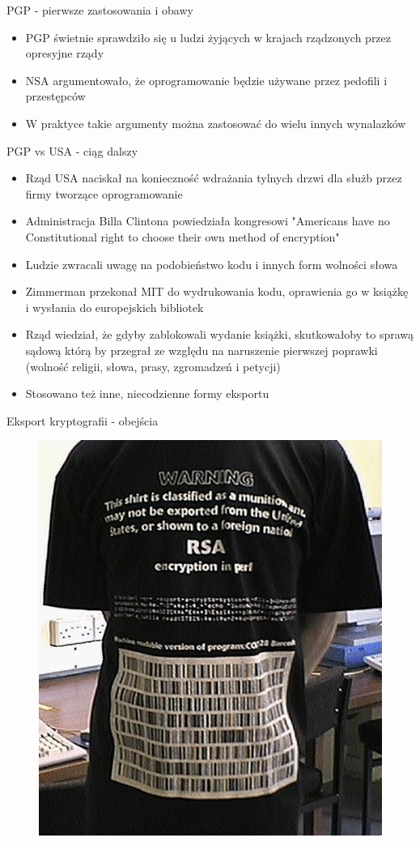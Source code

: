 \documentclass[aspectratio=169]{beamer}
\begin{document}
\begin{frame}{PGP - pierwsze zastosowania i obawy}
    \begin{itemize}
        \item PGP świetnie sprawdziło się u ludzi żyjących w krajach rządzonych przez opresyjne rządy
        \item NSA argumentowało, że oprogramowanie będzie używane przez pedofili i przestępców
        \item W praktyce takie argumenty można zastosować do wielu innych wynalazków
    \end{itemize}
\end{frame}

\begin{frame}{PGP vs USA - ciąg dalszy}
    \begin{itemize}
        \item Rząd USA naciskał na konieczność wdrażania tylnych drzwi dla służb przez firmy tworzące oprogramowanie
        \item Administracja Billa Clintona powiedziała kongresowi "Americans have no Constitutional right to choose their own method of encryption"
        \item Ludzie zwracali uwagę na podobieństwo kodu i innych form wolności słowa
        \item Zimmerman przekonał MIT do wydrukowania kodu, oprawienia go w książkę i wysłania do europejskich bibliotek
        \item Rząd wiedział, że gdyby zablokowali wydanie książki, skutkowałoby to sprawą sądową którą by przegrał ze względu na naruszenie pierwszej poprawki (wolność religii, słowa, prasy, zgromadzeń i petycji)
        \item Stosowano też inne, niecodzienne formy eksportu
    \end{itemize}
\end{frame}

\begin{frame}{Eksport kryptografii - obejścia}
    \begin{figure}
        \centering
        \includegraphics[width=0.5\linewidth]{rsa.jpg}
    \end{figure}
\end{frame}
\end{document}
